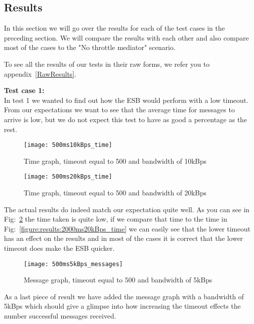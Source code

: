 \subsection{Results}\label{Testing:Results}
	In this section we will go over the results for each of the test cases in the preceding section. We will compare the results with each other and also compare most of the cases to the "No throttle mediator" scenario.
	
	\begin{shaded}
	To see all the results of our tests in their raw forms, we refer you to \mbox{appendix~\ref{RawResults}}.
	\end{shaded}
	 
    \textbf{Test case 1:}\\
    In test 1 we wanted to find out how the ESB would perform with a low timeout. From our expectations we want to see that the average time for messages to arrive is low, but we do not expect this test to have as good a percentage as the rest. 
    
	\begin{figure}[H]
		\centering
		\texttt{[image: 500ms10kBps\_time]}
		\caption{Time graph, timeout equal to 500 and bandwidth of 10kBps} 
		\label{figure:results:500ms10kBps_time}
	\end{figure}
	
	\begin{figure}[H]
		\centering
		\texttt{[image: 500ms20kBps\_time]}
		\caption{Time graph, timeout equal to 500 and bandwidth of 20kBps} 
		\label{figure:results:500ms20kBps_time}
	\end{figure}
    
    The actual results do indeed match our expectation quite well. As you can see in Fig:~\ref{figure:results:500ms20kBps_time} the time taken is quite low, if we compare that time to the time in Fig:~\ref{figure:results:2000ms20kBps_time} we can easily see that the lower timeout has an effect on the results and in most of the cases it is correct that the lower timeout does make the ESB quicker.
    
    \begin{figure}[H]
		\centering
		\texttt{[image: 500ms5kBps\_messages]}
		\caption{Message graph, timeout equal to 500 and bandwidth of 5kBps} 
		\label{figure:results:500ms5kBps_messages}
	\end{figure}
	
	As a last piece of result we have added the message graph with a bandwidth of 5kBps which should give a glimpse into how increasing the timeout effects the number successful messages received.
    
